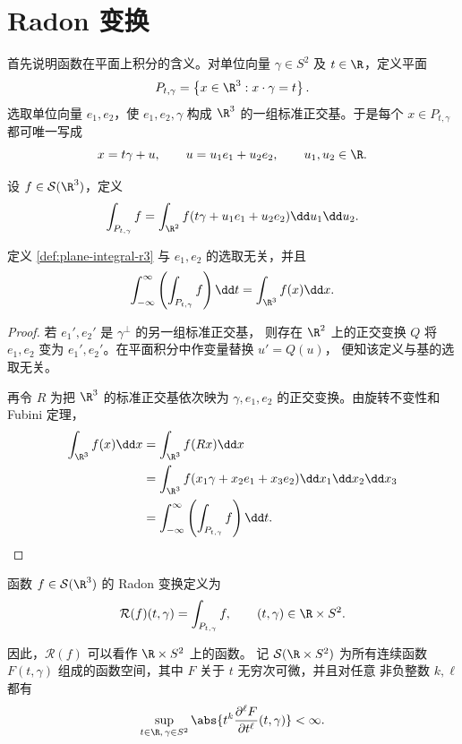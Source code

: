 \section{Radon 变换}

首先说明函数在平面上积分的含义。对单位向量
$\gamma\in S^2$ 及 $t\in\R$，定义平面
\[
P_{t,\gamma}
=\left\{x\in\R^3:x\cdot\gamma=t\right\}.
\]
选取单位向量 $e_1,e_2$，使 $e_1,e_2,\gamma$ 构成
$\R^3$ 的一组标准正交基。于是每个 $x\in P_{t,\gamma}$
都可唯一写成
\[
x=t\gamma+u,
\qquad
u=u_1e_1+u_2e_2,
\qquad u_1,u_2\in\R.
\]

\begin{definition}\label{def:plane-integral-r3}
	设 $f\in\mathcal S(\R^3)$，定义
	\[
	\int_{P_{t,\gamma}}f
	=\int_{\R^2}f(t\gamma+u_1e_1+u_2e_2)
	\dd u_1\dd u_2.
	\]
\end{definition}

\begin{proposition}\label{prop:plane-integral-well-defined}
	定义 \ref{def:plane-integral-r3} 与 $e_1,e_2$ 的选取无关，并且
	\[
	\int_{-\infty}^{\infty}
	\left(\int_{P_{t,\gamma}}f\right)\dd t
	=\int_{\R^3}f(x)\dd x.
	\]
\end{proposition}

\begin{proof}
	若 $e_1',e_2'$ 是 $\gamma^\perp$ 的另一组标准正交基，
	则存在 $\R^2$ 上的正交变换 $Q$ 将 $e_1,e_2$ 变为
	$e_1',e_2'$。在平面积分中作变量替换 $u'=Q(u)$，
	便知该定义与基的选取无关。

	再令 $R$ 为把 $\R^3$ 的标准正交基依次映为
	$\gamma,e_1,e_2$ 的正交变换。由旋转不变性和 Fubini 定理，
	\[
	\begin{aligned}
	\int_{\R^3}f(x)\dd x
	&=\int_{\R^3}f(Rx)\dd x\\
	&=\int_{\R^3}f(x_1\gamma+x_2e_1+x_3e_2)
	\dd x_1\dd x_2\dd x_3\\
	&=\int_{-\infty}^{\infty}
	\left(\int_{P_{t,\gamma}}f\right)\dd t.
	\end{aligned}
	\]
\end{proof}

\begin{definition}\label{def:radon-transform-r3}
	函数 $f\in\mathcal S(\R^3)$ 的 Radon 变换定义为
	\[
	\mathcal R(f)(t,\gamma)
	=\int_{P_{t,\gamma}}f,
	\qquad (t,\gamma)\in\R\times S^2.
	\]
\end{definition}

因此，$\mathcal R(f)$ 可以看作 $\R\times S^2$ 上的函数。
记 $\mathcal S(\R\times S^2)$ 为所有连续函数 $F(t,\gamma)$
组成的函数空间，其中 $F$ 关于 $t$ 无穷次可微，并且对任意
非负整数 $k,\ell$ 都有
\[
\sup_{t\in\R,\,\gamma\in S^2}
\abs{t^k\frac{\partial^\ell F}{\partial t^\ell}(t,\gamma)}
<\infty.
\]

